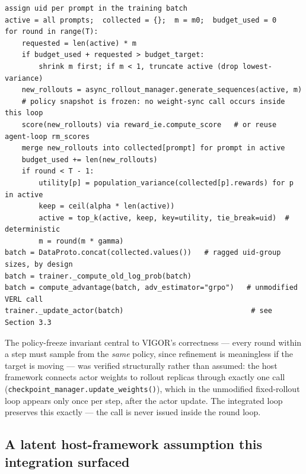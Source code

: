 \documentclass[11pt]{article}
\begin{document}
\begin{lstlisting}[caption={VIGOR training step, as integrated}, label=alg:vigor-step]
assign uid per prompt in the training batch
active = all prompts;  collected = {};  m = m0;  budget_used = 0
for round in range(T):
    requested = len(active) * m
    if budget_used + requested > budget_target:
        shrink m first; if m < 1, truncate active (drop lowest-variance)
    new_rollouts = async_rollout_manager.generate_sequences(active, m)
    # policy snapshot is frozen: no weight-sync call occurs inside this loop
    score(new_rollouts) via reward_ie.compute_score   # or reuse agent-loop rm_scores
    merge new_rollouts into collected[prompt] for prompt in active
    budget_used += len(new_rollouts)
    if round < T - 1:
        utility[p] = population_variance(collected[p].rewards) for p in active
        keep = ceil(alpha * len(active))
        active = top_k(active, keep, key=utility, tie_break=uid)  # deterministic
        m = round(m * gamma)
batch = DataProto.concat(collected.values())   # ragged uid-group sizes, by design
batch = trainer._compute_old_log_prob(batch)
batch = compute_advantage(batch, adv_estimator="grpo")   # unmodified VERL call
trainer._update_actor(batch)                              # see Section 3.3
\end{lstlisting}

The policy-freeze invariant central to VIGOR's correctness — every round within a
step must sample from the \emph{same} policy, since refinement is meaningless if
the target is moving — was verified structurally rather than assumed: the host
framework connects actor weights to rollout replicas through exactly one call
(\texttt{checkpoint\_manager.update\_weights()}), which in the unmodified fixed-rollout
loop appears only once per step, after the actor update. The integrated loop
preserves this exactly — the call is never issued inside the round loop.

\subsection{A latent host-framework assumption this integration surfaced}
\label{sec:minibatch-fix}
\end{document}
